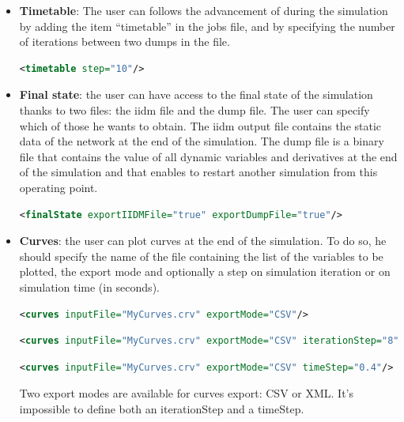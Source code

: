\documentclass[a4paper, 12pt]{report}
\begin{document}
\begin{itemize}
\item \textbf{Timetable}: The user can follows the advancement of \Dynawo during the simulation by adding the item ``timetable'' in the jobs file, and by specifying the number of iterations between two dumps in the file.

\begin{lstlisting}[language=XML, morekeywords={timeline},numbers=none]
<timetable step="10"/>
\end{lstlisting}

\item \textbf{Final state}: the user can have access to the final state of the simulation thanks to two files: the iidm file and the dump file. The user can specify which of those he wants to obtain. The iidm output file contains the static data of the network at the end of the simulation. The dump file is a binary file that contains the value of all dynamic variables and derivatives at the end of the simulation and that enables to restart another simulation from this operating point.

\begin{lstlisting}[language=XML, morekeywords={finalState},numbers=none]
<finalState exportIIDMFile="true" exportDumpFile="true"/>
\end{lstlisting}

\item \textbf{Curves}: the user can plot curves at the end of the simulation. To do so, he should specify the name of the file containing the list of the variables to be plotted, the export mode and optionally a step on simulation iteration or on simulation time (in seconds).

\begin{lstlisting}[language=XML, morekeywords={curves},numbers=none]
<curves inputFile="MyCurves.crv" exportMode="CSV"/>
\end{lstlisting}

\begin{lstlisting}[language=XML, morekeywords={curves},numbers=none]
<curves inputFile="MyCurves.crv" exportMode="CSV" iterationStep="8"/>
\end{lstlisting}

\begin{lstlisting}[language=XML, morekeywords={curves},numbers=none]
<curves inputFile="MyCurves.crv" exportMode="CSV" timeStep="0.4"/>
\end{lstlisting}

Two export modes are available for curves export: CSV or XML.
It's impossible to define both an iterationStep and a timeStep.


\end{itemize}
\end{document}
